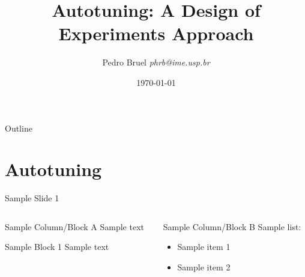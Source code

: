 \documentclass[10pt, compress, aspectratio=169, xcolor={table,usenames,dvipsnames}]{beamer}
\author{\footnotesize Pedro Bruel \newline \scriptsize \emph{phrb@ime.usp.br}}
\date{\scriptsize \today}
\title{Autotuning: A Design of Experiments Approach}
\begin{document}
\maketitle
\begin{frame}{Outline}
\tableofcontents
\end{frame}


\section{Autotuning}
\label{sec:orgd2b5d7e}
\begin{frame}[label={sec:orge43ffc5}]{Sample Slide 1}
\begin{columns}
\begin{column}{0.5\columnwidth}
\begin{block}{Sample Column/Block A}
Sample text

\begin{block}{Sample Block 1}
Sample \alert{text}
\end{block}
\end{block}
\end{column}

\begin{column}{0.5\columnwidth}
\begin{block}{Sample Column/Block B}
Sample list:

\begin{itemize}
\item Sample item 1
\item Sample item 2
\end{itemize}
\end{block}
\end{column}
\end{columns}
\end{frame}
\maketitle
\end{document}
